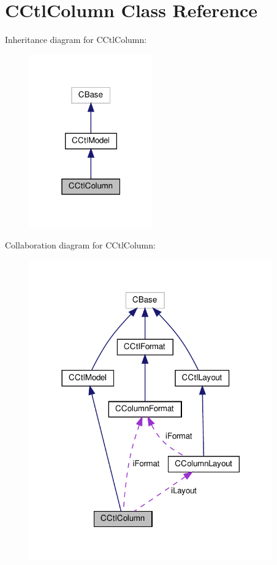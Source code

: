 \hypertarget{classCCtlColumn}{}\section{C\+Ctl\+Column Class Reference}
\label{classCCtlColumn}


Inheritance diagram for C\+Ctl\+Column\+:
\nopagebreak
\begin{figure}[H]
\begin{center}
\leavevmode
\includegraphics[width=151pt]{classCCtlColumn__inherit__graph}
\end{center}
\end{figure}


Collaboration diagram for C\+Ctl\+Column\+:
\nopagebreak
\begin{figure}[H]
\begin{center}
\leavevmode
\includegraphics[width=297pt]{classCCtlColumn__coll__graph}
\end{center}
\end{figure}
